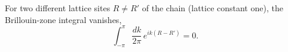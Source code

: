 \documentclass{article}
\begin{document}
For two different lattice sites $R \neq R'$ of the chain (lattice constant one), the Brillouin-zone integral vanishes,
\begin{equation}
\int_{-\pi}^{\pi} \frac{dk}{2\pi}\, e^{ik(R-R')} = 0 .
\label{eq:bz}
\end{equation}
\end{document}
